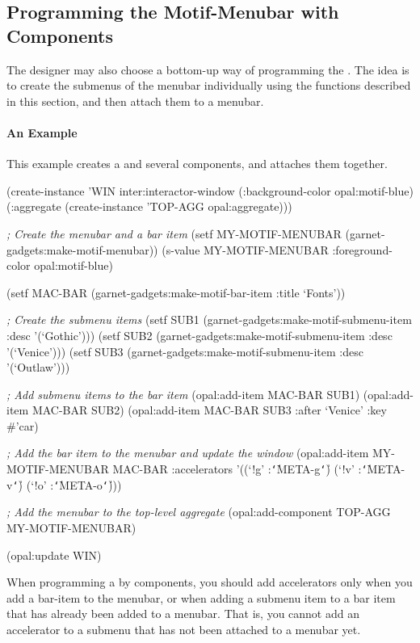 \begin{group}
\subsection{Programming the Motif-Menubar with Components}
\label{mmbar-components}

The designer may also choose a bottom-up way of programming the
.  The idea is to create the submenus of the menubar
individually using the functions described in this section, and then attach
them to a menubar.

\paragraph{An Example}

This example creates a  and several components, and
attaches them together.

\begin{programexample}
(create-instance 'WIN inter:interactor-window
  (:background-color opal:motif-blue)
  (:aggregate (create-instance 'TOP-AGG opal:aggregate)))
	
{\it ; Create the menubar and a bar item}
(setf MY-MOTIF-MENUBAR (garnet-gadgets:make-motif-menubar))
(s-value MY-MOTIF-MENUBAR :foreground-color opal:motif-blue)
		
(setf MAC-BAR (garnet-gadgets:make-motif-bar-item :title `Fonts'))
		
{\it ; Create the submenu items}
(setf SUB1 (garnet-gadgets:make-motif-submenu-item :desc '(`Gothic')))
(setf SUB2 (garnet-gadgets:make-motif-submenu-item :desc '(`Venice')))
(setf SUB3 (garnet-gadgets:make-motif-submenu-item :desc '(`Outlaw')))
		
{\it ; Add submenu items to the bar item}
(opal:add-item MAC-BAR SUB1)
(opal:add-item MAC-BAR SUB2)
(opal:add-item MAC-BAR SUB3 :after `Venice' :key \#'car)
		
{\it ; Add the bar item to the menubar and update the window}
(opal:add-item MY-MOTIF-MENUBAR MAC-BAR
	       :accelerators '((`!g' :{\tt\char`\|}META-g{\tt\char`\|}) (`!v' :{\tt\char`\|}META-v{\tt\char`\|}) (`!o' :{\tt\char`\|}META-o{\tt\char`\|})))

{\it ; Add the menubar to the top-level aggregate}
(opal:add-component TOP-AGG MY-MOTIF-MENUBAR)
		
(opal:update WIN)
\end{programexample}

When programming a  by components, you should add
accelerators only when you add a bar-item to the menubar, or when adding
a submenu item to a bar item that has already been added to a menubar.
That is, you cannot add an accelerator to a submenu that has not been attached
to a menubar yet.
\end{group}

